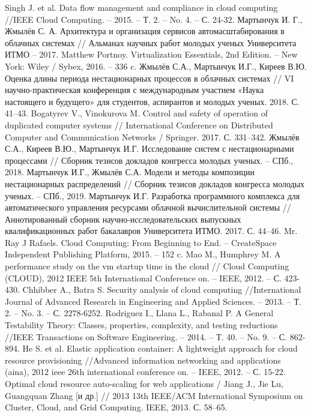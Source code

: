 \begin{thebibliography}{40}
Singh J. et al. Data flow management and compliance in cloud computing //IEEE Cloud Computing. – 2015. – Т. 2. – No. 4. – С. 24-32.
Мартынчук И. Г., Жмылёв С. А. Архитектура и организация сервисов автомасштабирования в облачных системах // Альманах научных работ молодых ученых Университета ИТМО – 2017.
Matthew Portnoy. Virtualization Essentials, 2nd Edition. – New York: Wiley / Sybex, 2016. – 336 c.
Жмылёв С.А., Мартынчук И.Г., Киреев В.Ю. Оценка длины периода нестационарных процессов в облачных системах // VI научно-практическая конференция с международным участием «Наука настоящего и будущего» для студентов, аспирантов и молодых ученых. 2018. С. 41–43.
Bogatyrev V., Vinokurova M. Control and safety of operation of duplicated computer systems // International Conference on Distributed Computer and Communication Networks / Springer. 2017. С. 331–342.
Жмылёв С.А., Киреев В.Ю., Мартынчук И.Г. Исследование систем с нестационарными процессами // Сборник тезисов докладов конгресса молодых ученых. – СПб., 2018.
Мартынчук И.Г., Жмылёв С.А. Модели и методы композиции нестационарных распределений // Сборник тезисов докладов конгресса молодых ученых. – СПб., 2019.
Мартынчук И.Г. Разработка программного комплекса для автоматического управления ресурсами облачной вычислительной системы // Аннотированный сборник научно-исследовательских выпускных квалификационных работ бакалавров Университета ИТМО. 2017. С. 44–46.
Mr. Ray J Rafaels. Cloud Computing: From Beginning to End. – CreateSpace Independent Publishing Platform, 2015. – 152 c.
Mao M., Humphrey M. A performance study on the vm startup time in the cloud // Cloud Computing (CLOUD), 2012 IEEE 5th International Conference on. – IEEE, 2012. – С. 423-430.
Chhibber A., Batra S. Security analysis of cloud computing //International Journal of Advanced Research in Engineering and Applied Sciences. – 2013. – Т. 2. – No. 3. – С. 2278-6252.
Rodriguez I., Llana L., Rabanal P. A General Testability Theory: Classes, properties, complexity, and testing reductions //IEEE Transactions on Software Engineering. – 2014. – Т. 40. – No. 9. – С. 862-894.
He S. et al. Elastic application container: A lightweight approach for cloud resource provisioning //Advanced information networking and applications (aina), 2012 ieee 26th international conference on. – IEEE, 2012. – С. 15-22.
Optimal cloud resource auto-scaling for web applications / Jiang J., Jie Lu, Guangquan Zhang [и др.] // 2013 13th IEEE/ACM International Symposium on Cluster, Cloud, and Grid Computing. IEEE, 2013. С. 58–65.

\end{thebibliography}
